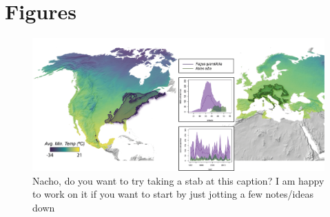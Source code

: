 \documentclass[12pt]{article}\usepackage[]{graphicx}\usepackage[]{color}
\begin{document}

\section*{Figures}

\begin{figure}[h!]
    \centering
 \includegraphics[width=\textwidth]{..//..//analyses/ranges/figures/concept figure draft2.png} 
    \caption{Nacho, do you want to try taking a stab at this caption? I am happy to work on it if you want to start by just jotting a few notes/ideas down}
    \label{fig:concept}
\end{figure}
\end{document}
